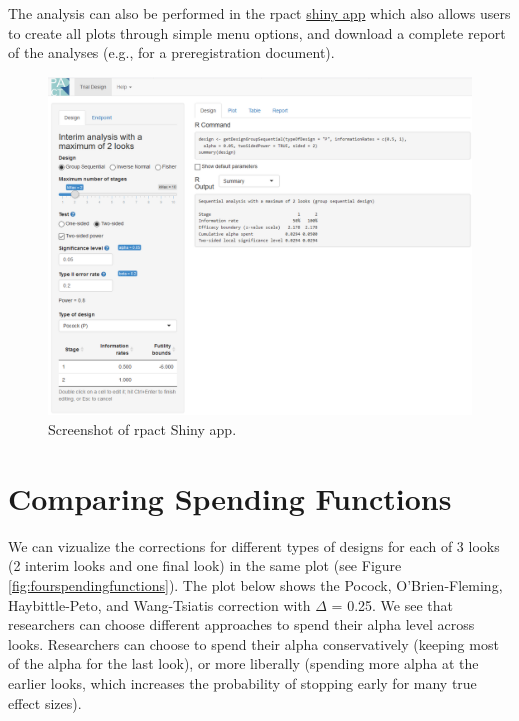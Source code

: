 \documentclass[
  oneside]{book}
\begin{document}
The analysis can also be performed in the rpact \href{https://rpact.shinyapps.io/public/}{shiny app} which also allows users to create all plots through simple menu options, and download a complete report of the analyses (e.g., for a preregistration document).



\begin{figure}

{\centering \includegraphics[width=1\linewidth]{images/RPact1} 

}

\caption{Screenshot of rpact Shiny app.}\label{fig:rpactshiny}
\end{figure}

\hypertarget{comparing-spending-functions}{%
\section{Comparing Spending Functions}\label{comparing-spending-functions}}

We can vizualize the corrections for different types of designs for each of 3 looks (2 interim looks and one final look) in the same plot (see Figure \ref{fig:fourspendingfunctions}). The plot below shows the Pocock, O'Brien-Fleming, Haybittle-Peto, and Wang-Tsiatis correction with \(\Delta\) = 0.25. We see that researchers can choose different approaches to spend their alpha level across looks. Researchers can choose to spend their alpha conservatively (keeping most of the alpha for the last look), or more liberally (spending more alpha at the earlier looks, which increases the probability of stopping early for many true effect sizes).
\end{document}

